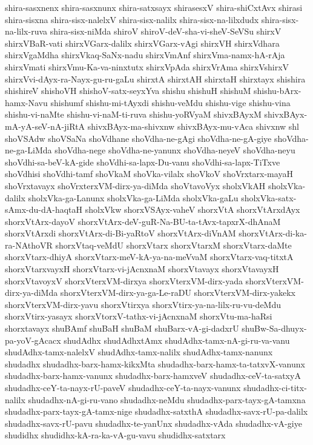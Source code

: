 {shira-sasxnenx
shira-sasxnunx
shira-satxsayx
shirasesxV
shira-shiCxtAvx
shirasi
shira-sisxna
shira-sisx-nalelxV
shira-sisx-nalilx
shira-sisx-na-lilxdudx
shira-sisx-na-lilx-ruva
shira-sisx-niMda
shiroV
shiroV-deV-sha-vi-sheV-SeVSu
shirxV
shirxVBaR-vati
shirxVGarx-dalilx
shirxVGarx-vAgi
shirxVH
shirxVdhara
shirxVgaMdha
shirxVkaq-SaNx-nadu
shirxVmAnf
shirxVma-namx-hA-rAja
shirxVmati
shirxVmu-Ka-va-ninxtutx
shirxVpAda
shirxVrAma
shirxVshirxV
shirxVvi-dAyx-ra-Nayx-gu-ru-gaLu
shirxtA
shirxtAH
shirxtaH
shirxtayx
shishira
shishireV
shishoVH
shishoV-satx-seyxYva
shishu
shishuH
shishuM
shishu-bArx-hamx-Navu
shishumf
shishu-mi-tAyxdi
shishu-veMdu
shishu-vige
shishu-vina
shishu-vi-naMte
shishu-vi-naM-ti-ruva
shishu-yoRVyaM
shivxBAyxM
shivxBAyx-mA-yA-seV-nA-jiRtA
shivxBAyx-ma-shivxnw
shivxBAyx-mu-vAca
shivxnw
shl
shoVSAdw
shoVSaNa
shoVdhane
shoVdha-ne-gAgi
shoVdha-ne-gA-giye
shoVdha-ne-ga-LiMda
shoVdha-nege
shoVdha-ne-yanunx
shoVdha-neyeV
shoVdha-neyu
shoVdhi-sa-beV-kA-gide
shoVdhi-sa-lapx-Du-vanu
shoVdhi-sa-lapx-TiTxve
shoVdhisi
shoVdhi-tamf
shoVkaM
shoVka-vilalx
shoVkoV
shoVrxtarx-mayaH
shoVrxtavayx
shoVrxterxVM-dirx-ya-diMda
shoVtavoVyx
sholxVkAH
sholxVka-dalilx
sholxVka-ga-Lanunx
sholxVka-ga-LiMda
sholxVka-gaLu
sholxVka-satx-sAmx-du-dA-haqtaH
sholxVkw
shorxVSAyx-vaheV
shorxVtA
shorxVtArxdAyx
shorxVtArx-dayoV
shorxVtArx-deV-guR-Na-BU-ta-tAvx-tapxrX-dhAnaM
shorxVtArxdi
shorxVtArx-di-Bi-yaRtoV
shorxVtArx-diVnAM
shorxVtArx-di-ka-ra-NAthoVR
shorxVtaq-veMdU
shorxVtarx
shorxVtarxM
shorxVtarx-daMte
shorxVtarx-dhiyA
shorxVtarx-meV-kA-ya-na-meVvaM
shorxVtarx-vaq-titxtA
shorxVtarxvayxH
shorxVtarx-vi-jAcnxnaM
shorxVtavayx
shorxVtavayxH
shorxVtavoyxV
shorxVterxVM-dirxya
shorxVterxVM-dirx-yada
shorxVterxVM-dirx-ya-diMda
shorxVterxVM-dirx-ya-ga-Le-raDU
shorxVterxVM-dirx-yakekx
shorxVterxVM-dirx-yavu
shorxVtirxya
shorxVtirx-ya-na-lilx-ru-vu-deMdu
shorxVtirx-yasayx
shorxVtorxV-tathx-vi-jAcnxnaM
shorxVtu-ma-haRsi
shorxtavayx
shuBAmf
shuBaH
shuBaM
shuBarx-vA-gi-dadxrU
shuBw-Sa-dhuyx-pa-yoV-gAcacx
shudAdhx
shudAdhxtAmx
shudAdhx-tamx-nA-gi-ru-va-vanu
shudAdhx-tamx-nalelxV
shudAdhx-tamx-nalilx
shudAdhx-tamx-nanunx
shudadhx
shudadhx-barx-hamx-kikxMta
shudadhx-barx-hamx-ta-tatxvX-vanunx
shudadhx-barx-hamx-vanunx
shudadhx-barx-hamxveV
shudadhx-ceV-ta-satxyA
shudadhx-ceY-ta-nayx-rU-paveV
shudadhx-ceY-ta-nayx-vanunx
shudadhx-ci-titx-nalilx
shudadhx-nA-gi-ru-vano
shudadhx-neMdu
shudadhx-parx-tayx-gA-tamxna
shudadhx-parx-tayx-gA-tamx-nige
shudadhx-satxthA
shudadhx-savx-rU-pa-dalilx
shudadhx-savx-rU-pavu
shudadhx-te-yanUnx
shudadhx-vAda
shudadhx-vA-giye
shudidhx
shudidhx-kA-ra-ka-vA-gu-vavu
shudidhx-satxtarx
}

